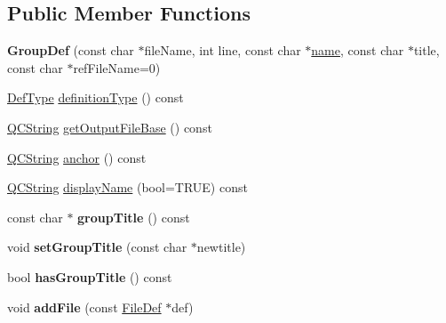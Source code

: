 \subsection*{Public Member Functions}
\begin{DoxyCompactItemize}
\item 
\mbox{\label{class_group_def_a38cde7c40f0b6089b99efa85629b6da8}} 
{\bfseries Group\+Def} (const char $\ast$file\+Name, int line, const char $\ast$\mbox{\hyperlink{class_definition_a9324000f785d7b6b098878a3bca4df5b}{name}}, const char $\ast$title, const char $\ast$ref\+File\+Name=0)
\item 
\mbox{\hyperlink{class_definition_intf_ada60114bc621669dd8c19edfc6421766}{Def\+Type}} \mbox{\hyperlink{class_group_def_a1b6b622a9adaeb6b2845945ccb1ddd93}{definition\+Type}} () const
\item 
\mbox{\hyperlink{class_q_c_string}{Q\+C\+String}} \mbox{\hyperlink{class_group_def_a6320c7b06b29937039549be13a698e20}{get\+Output\+File\+Base}} () const
\item 
\mbox{\hyperlink{class_q_c_string}{Q\+C\+String}} \mbox{\hyperlink{class_group_def_a924c6e5a6fe495d70383ddc751704095}{anchor}} () const
\item 
\mbox{\hyperlink{class_q_c_string}{Q\+C\+String}} \mbox{\hyperlink{class_group_def_a9707ecaf7f4e7231016b68a7e3f811e8}{display\+Name}} (bool=T\+R\+UE) const
\item 
\mbox{\label{class_group_def_aeb7f2ffe66a4696a36322de18e605534}} 
const char $\ast$ {\bfseries group\+Title} () const
\item 
\mbox{\label{class_group_def_a0a3c458b0cb95ce838ba7ba9b120ff26}} 
void {\bfseries set\+Group\+Title} (const char $\ast$newtitle)
\item 
\mbox{\label{class_group_def_a3a3a4f8bfc8ec589a74ead85e6d6c250}} 
bool {\bfseries has\+Group\+Title} () const
\item 
\mbox{\label{class_group_def_a9a676ba60547c855e012529a1123e1bf}} 
void {\bfseries add\+File} (const \mbox{\hyperlink{class_file_def}{File\+Def}} $\ast$def)
\item 
\mbox{\label{class_group_def_a20aabb4f8669ea993290f1cd79c841f1}} 

\end{DoxyCompactItemize}
